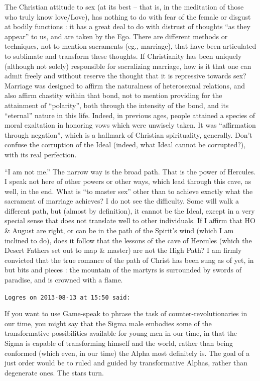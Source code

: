 \begin{footnotesize}
\begin{sffamily}
The Christian attitude to sex (at its best -- that is, in the meditation of those who truly know love/Love), has nothing to do with fear of the female or disgust at bodily functions : it has a great deal to do with distrust of thoughts ``as they appear'' to us, and are taken by the Ego. There are different methods or techniques, not to mention sacraments (eg., marriage), that have been articulated to sublimate and transform these thoughts. If Christianity has been uniquely (although not solely) responsible for sacralizing marriage, how is it that one can admit freely and without reserve the thought that it is repressive towards sex? Marriage was designed to affirm the naturalness of heterosexual relations, and also affirm chastity within that bond, not to mention providing for the attainment of ``polarity'', both through the intensity of the bond, and its ``eternal'' nature in this life. Indeed, in previous ages, people attained a species of moral exaltation in honoring vows which were unwisely taken. It was ``affirmation through negation'', which is a hallmark of Christian spirituality, generally. Don't confuse the corruption of the Ideal (indeed, what Ideal cannot be corrupted?), with its real perfection.

``I am not me.'' The narrow way is the broad path. That is the power of Hercules. I speak not here of other powers or other ways, which lead through this cave, as well, in the end. What is ``to master sex'' other than to achieve exactly what the sacrament of marriage achieves? I do not see the difficulty. Some will walk a different path, but (almost by definition), it cannot be the Ideal, except in a very special sense that does not translate well to other individuals. If I affirm that HO \& August are right, or can be in the path of the Spirit's wind (which I am inclined to do), does it follow that the lessons of the cave of Hercules (which the Desert Fathers set out to map \& master) are not the High Path? I am firmly convicted that the true romance of the path of Christ has been sung as of yet, in but bits and pieces : the mountain of the martyrs is surrounded by swords of paradise, and is crowned with a flame.

\hfill

\texttt{Logres on 2013-08-13 at 15:50 said:}

If you want to use Game-speak to phrase the task of counter-revolutionaries in our time, you might say that the Sigma male embodies some of the transformative possibilities available for young men in our time, in that the Sigma is capable of transforming himself and the world, rather than being conformed (which even, in our time) the Alpha most definitely is. The goal of a just order would be to ruled and guided by transformative Alphas, rather than degenerate ones. The stars turn.


\end{sffamily}
\end{footnotesize}
